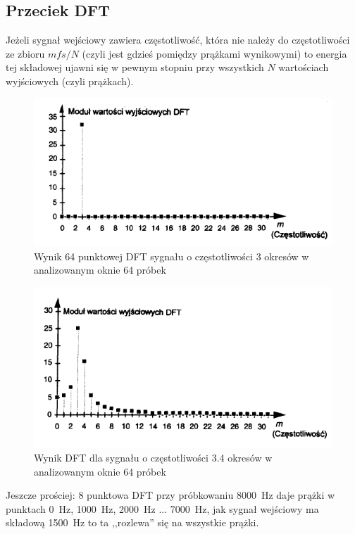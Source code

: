 \documentclass[a4paper,twoside]{report}
\begin{document}
\subsection{Przeciek DFT}
Jeżeli sygnał wejściowy zawiera częstotliwość, która nie należy do częstotliwości ze zbioru $ mfs/N $ (czyli jest gdzieś pomiędzy prążkami wynikowymi) to energia tej składowej ujawni się w pewnym stopniu przy wszystkich $N$ wartościach wyjściowych (czyli prążkach).

\begin{figure}[htbp]
	\centering
	\includegraphics[scale=0.7]{obrazy/fourier/3okresy.png}
	\caption{Wynik 64 punktowej DFT sygnału o częstotliwości 3 okresów w analizowanym oknie 64 próbek}
\end{figure}

\begin{figure}[htbp]
	\centering
	\includegraphics[scale=0.7]{obrazy/fourier/34okresy.png}
	\caption{Wynik DFT dla sygnału o częstotliwości 3.4 okresów w analizowanym oknie 64 próbek }
\end{figure}

Jeszcze prościej: 8 punktowa DFT przy próbkowaniu 8000~Hz daje prążki w punktach 0~Hz, 1000~Hz, 2000~Hz ... 7000~Hz, jak sygnał wejściowy ma składową 1500~Hz to ta ,,rozlewa'' się na wszystkie prążki. 
\end{document}

